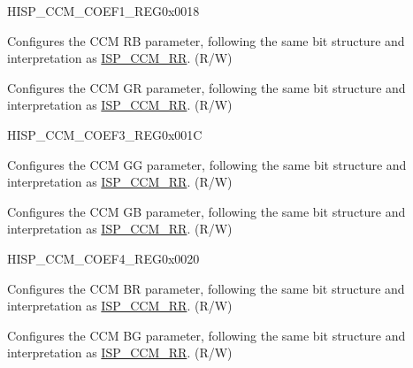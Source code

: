 \begin{register}{H}{ISP\_CCM\_COEF1\_REG}{0x0018}\label{regdesc:ISPCCMCOEF1REG}
%
%
%
\regnewline%
\begin{regdesc}\begin{reglist}
\label{fielddesc:ISPCCMRB}\item [ISP\_CCM\_RB] Configures the CCM RB parameter, following the same bit structure and interpretation as \hyperref[fielddesc:ISPCCMRR]{ISP\_CCM\_RR}. (R/W)
\label{fielddesc:ISPCCMGR}\item [ISP\_CCM\_GR] Configures the CCM GR parameter, following the same bit structure and interpretation as \hyperref[fielddesc:ISPCCMRR]{ISP\_CCM\_RR}. (R/W)
\end{reglist}\end{regdesc}
\end{register}


\begin{register}{H}{ISP\_CCM\_COEF3\_REG}{0x001C}\label{regdesc:ISPCCMCOEF3REG}
%
%
%
\regnewline%
\begin{regdesc}\begin{reglist}
\label{fielddesc:ISPCCMGG}\item [ISP\_CCM\_GG] Configures the CCM GG parameter, following the same bit structure and interpretation as \hyperref[fielddesc:ISPCCMRR]{ISP\_CCM\_RR}. (R/W)
\label{fielddesc:ISPCCMGB}\item [ISP\_CCM\_GB] Configures the CCM GB parameter, following the same bit structure and interpretation as \hyperref[fielddesc:ISPCCMRR]{ISP\_CCM\_RR}. (R/W)
\end{reglist}\end{regdesc}
\end{register}


\begin{register}{H}{ISP\_CCM\_COEF4\_REG}{0x0020}\label{regdesc:ISPCCMCOEF4REG}
%
%
%
\regnewline%
\begin{regdesc}\begin{reglist}
\label{fielddesc:ISPCCMBR}\item [ISP\_CCM\_BR] Configures the CCM BR parameter, following the same bit structure and interpretation as \hyperref[fielddesc:ISPCCMRR]{ISP\_CCM\_RR}. (R/W)
\label{fielddesc:ISPCCMBG}\item [ISP\_CCM\_BG] Configures the CCM BG parameter, following the same bit structure and interpretation as \hyperref[fielddesc:ISPCCMRR]{ISP\_CCM\_RR}. (R/W)
\end{reglist}\end{regdesc}
\end{register}


